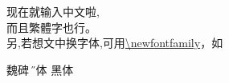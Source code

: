 \documentclass[12pt]{article} %
\begin{document}
 \thispagestyle{empty}

\small{现在就输入中文啦,\\

而且繁體字也行。\\

另,若想文中换字体,可用\url{\newfontfamily}，如\\}

\Huge{{\E 魏碑} {\H 宋体} 黑体}
\end{document}
